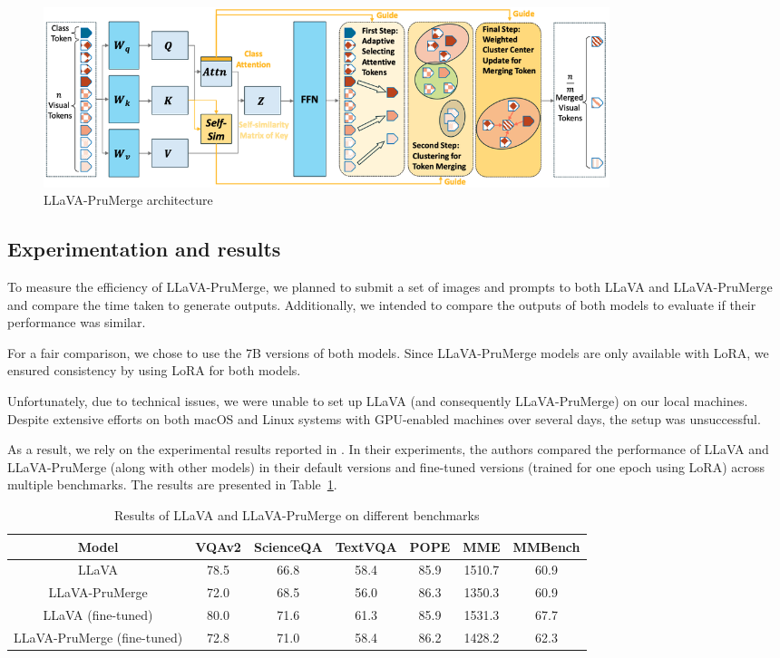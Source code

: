 \documentclass[onecolumn]{IEEEtran}
\begin{document}
\begin{figure}[H]
    \centering
    \includegraphics[width=0.8\textwidth]{images/prumerge.png}
    \caption{LLaVA-PruMerge architecture \cite{shang2024LLaVA-PruMerge}}
    \label{fig:llava-prumerge}
\end{figure}

\subsection{Experimentation and results}
To measure the efficiency of LLaVA-PruMerge, we planned to submit a set of images and prompts to both LLaVA and LLaVA-PruMerge and compare the time taken to generate outputs. Additionally, we intended to compare the outputs of both models to evaluate if their performance was similar.  

For a fair comparison, we chose to use the 7B versions of both models. Since LLaVA-PruMerge models are only available with LoRA, we ensured consistency by using LoRA for both models.  

Unfortunately, due to technical issues, we were unable to set up LLaVA (and consequently LLaVA-PruMerge) on our local machines. Despite extensive efforts on both macOS and Linux systems with GPU-enabled machines over several days, the setup was unsuccessful.  

As a result, we rely on the experimental results reported in \cite{shang2024LLaVA-PruMerge}. In their experiments, the authors compared the performance of LLaVA and LLaVA-PruMerge (along with other models) in their default versions and fine-tuned versions (trained for one epoch using LoRA) across multiple benchmarks. The results are presented in Table~\ref{tab:prumerge-results}.


\begin{table}[H]
    \centering
    \begin{tabular}{|c|c|c|c|c|c|c|}
        \hline
        Model & VQAv2 \cite{goyal2017making} & ScienceQA \cite{lu2022learn} & TextVQA \cite{singh2019towards} & POPE \cite{li2023evaluating} & MME \cite{yin2024survey} & MMBench \cite{liu2025mmbench}\\
        \hline
        LLaVA & 78.5 & 66.8 & 58.4 & 85.9 & 1510.7 & 60.9 \\
        LLaVA-PruMerge & 72.0 & 68.5 & 56.0 & 86.3 & 1350.3 & 60.9 \\
        LLaVA (fine-tuned) & 80.0 & 71.6 & 61.3 & 85.9 & 1531.3 & 67.7 \\
        LLaVA-PruMerge (fine-tuned) & 72.8 & 71.0 & 58.4 & 86.2 & 1428.2 & 62.3 \\
        \hline
    \end{tabular}
    \caption{Results of LLaVA and LLaVA-PruMerge on different benchmarks \cite{shang2024LLaVA-PruMerge}}
    \label{tab:prumerge-results}
\end{table}
\end{document}
